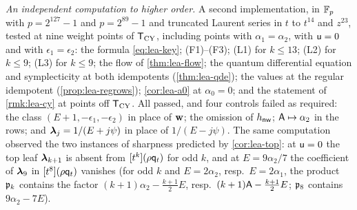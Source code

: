\emph{An independent computation to higher order.} A second implementation, in $\mathbb{F}_p$ with $p=2^{127}-1$ and $p=2^{89}-1$ and truncated Laurent series in $t$ to $t^{14}$ and $z^{23}$, tested at nine weight points of $\mathsf{T}_{\mathrm{CY}}$, including points with $\alpha_1=\alpha_2$, with $\mathsf{u}=0$ and with $\epsilon_1=\epsilon_2$: the formula \eqref{eq:lea-key}; (F1)--(F3); (L1) for $k\leq 13$; (L2) for $k\leq 9$; (L3) for $k\leq 9$; the flow of \cref{thm:lea-flow}; the quantum differential equation and symplecticity at both idempotents (\cref{thm:lea-qde}); the values at the regular idempotent (\cref{prop:lea-regrows}); \cref{cor:lea-a0} at $\alpha_0=0$; and the statement of \cref{rmk:lea-cy} at points off $\mathsf{T}_{\mathrm{CY}}$. All passed, and four controls failed as required: the class $(E+1,-\epsilon_1,-\epsilon_2)$ in place of $\mathbf{w}$; the omission of $h_{\mathsf{nw}}$; $\mathsf{A}\mapsto\alpha_2$ in the rows; and $\boldsymbol{\lambda}_j=1/(E+j\psi)$ in place of $1/(E-j\psi)$. The same computation observed the two instances of sharpness predicted by \cref{cor:lea-top}: at $\mathsf{u}=0$ the top leaf $\boldsymbol{\lambda}_{k+1}$ is absent from $[t^k](\rho\mathsf{q}_{t})$ for odd $k$, and at $E=9\alpha_2/7$ the coefficient of $\boldsymbol{\lambda}_9$ in $[t^8](\rho\mathsf{q}_{t})$ vanishes (for odd $k$ and $E=2\alpha_2$, resp.\ $E=2\alpha_1$, the product $\mathfrak{p}_k$ contains the factor $(k+1)\alpha_2-\tfrac{k+1}{2}E$, resp.\ $(k+1)\mathsf{A}-\tfrac{k+1}{2}E$; $\mathfrak{p}_8$ contains $9\alpha_2-7E$).

